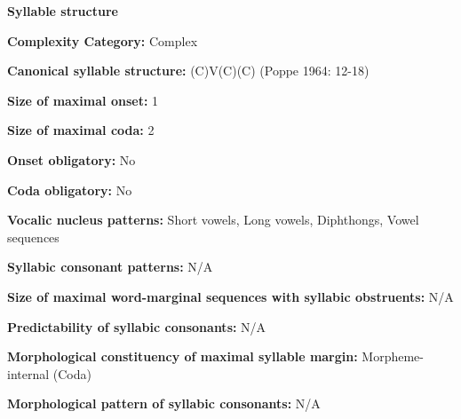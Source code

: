\begin{styleBody}
\textbf{Syllable structure}
\end{styleBody}

\begin{styleBody}
\textbf{Complexity Category:} Complex
\end{styleBody}

\begin{styleBody}
\textbf{Canonical syllable structure:} (C)V(C)(C)\textbf{ }(Poppe 1964: 12-18)
\end{styleBody}

\begin{styleBody}
\textbf{Size of maximal onset:} 1
\end{styleBody}

\begin{styleBody}
\textbf{Size of maximal coda:} 2
\end{styleBody}

\begin{styleBody}
\textbf{Onset obligatory:} No
\end{styleBody}

\begin{styleBody}
\textbf{Coda obligatory:} No
\end{styleBody}

\begin{styleBody}
\textbf{Vocalic nucleus patterns:} Short vowels, Long vowels, Diphthongs, Vowel sequences
\end{styleBody}

\begin{styleBody}
\textbf{Syllabic consonant patterns:} N/A
\end{styleBody}

\begin{styleBody}
\textbf{Size of maximal word{}-marginal sequences with syllabic obstruents:} N/A
\end{styleBody}

\begin{styleBody}
\textbf{Predictability of syllabic consonants:} N/A
\end{styleBody}

\begin{styleBody}
\textbf{Morphological constituency of maximal syllable margin:} Morpheme-internal (Coda)
\end{styleBody}

\begin{styleBody}
\textbf{Morphological pattern of syllabic consonants:} N/A
\end{styleBody}

